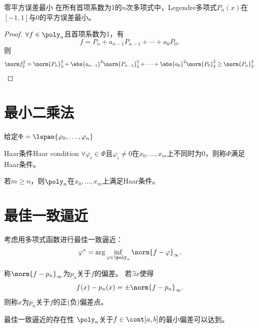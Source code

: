 \begin{theorem}
    {零平方误差最小}{}
    在所有首项系数为1的$n$次多项式中，Legendre多项式$P_n(x)$在$[-1,1]$与0的平方误差最小。
\end{theorem}

\begin{proof}
    $\forall f\in\poly_n$且首项系数为1，有
    \[
        f=P_n+a_{n-1}P_{n-1}+\cdots+a_0P_0,
    \]
    则
    \[
        \norm f_2^2=\norm{P_n}_2^2+\abs{a_{n-1}}^2\norm{P_{n-1}}_2^2+\cdots+\abs{a_0}^2\norm{P_0}_2^2\geq\norm{P_n}_2^2.
        \qedhere
    \]
\end{proof}

\section{最小二乘法}
\label{sec:least squares algorithm}

给定$\Phi=\lspan\{\varphi_0,\ldots,\varphi_n\}$

\begin{definition}
    {Haar条件}{Haar condition}
    $\forall \varphi_i\in\Phi$且$\varphi_i\neq 0$在$x_0,\ldots,x_m$上不同时为0，则称$\Phi$满足Haar条件。
\end{definition}

\begin{example}
    {}{}
    若$m\geq n$，则$\poly_n$在$x_0,\ldots,x_m$上满足Haar条件。
\end{example}

\section{最佳一致逼近}
\label{sec:optimal uniform approximation}

考虑用多项式函数进行最佳一致逼近：
\begin{equation}
    \varphi^*=\arg\inf_{\varphi\in\poly_n}\norm{f-\varphi}_\infty.
\end{equation}

\begin{definition}
    {}{}
    称$\norm{f-p_n}_\infty$为$p_n$关于$f$的偏差。
    若$\exists x$使得
    \begin{equation}
        f(x)-p_n(x)=\pm\norm{f-p_n}_\infty.
    \end{equation}
    则称$x$为$p_n$关于$f$的正(负)偏差点。
\end{definition}

\begin{theorem}
    {最佳一致逼近的存在性}{}
    $\poly_n$关于$f\in\cont[a,b]$的最小偏差可以达到。
\end{theorem}

